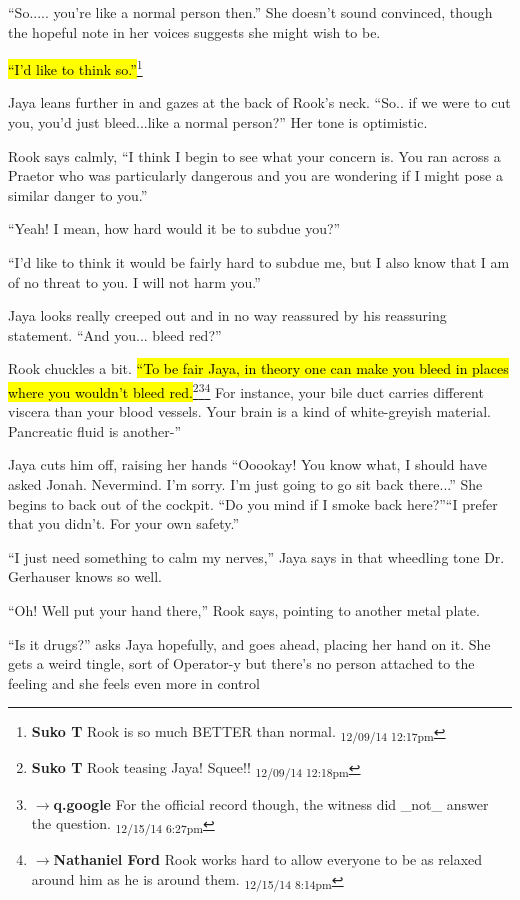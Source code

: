 ``So..... you're like a normal person then.''  She doesn't sound convinced, though the hopeful note in her voices suggests she might wish to be.

\hl{``I'd like to think so.''}\footnote{\textbf{Suko T }Rook is so much BETTER than normal. \textsubscript{12/09/14 12:17pm}}

Jaya leans further in and gazes at the back of Rook's neck.  ``So.. if we were to cut you, you'd just bleed...like a normal person?''  Her tone is optimistic.

Rook says calmly, ``I think I begin to see what your concern is.  You ran across a Praetor who was particularly dangerous and you are wondering if I might pose a similar danger to you.''

``Yeah!  I mean, how hard would it be to subdue you?''

``I'd like to think it would be fairly hard to subdue me, but I also know that I am of no threat to you.  I will not harm you.''

Jaya looks really creeped out and in no way reassured by his reassuring statement.   ``And you... bleed red?''

Rook chuckles a bit. \hl{``To be fair Jaya, in theory one can make you bleed in places where you wouldn't bleed red.}\footnote{\textbf{Suko T }Rook teasing Jaya!  Squee!! \textsubscript{12/09/14 12:18pm}}\footnote{$\rightarrow$\textbf{q.google }For the official record though, the witness did \_not\_ answer the question. \textsubscript{12/15/14 6:27pm}}\footnote{$\rightarrow$\textbf{Nathaniel Ford }Rook works hard to allow everyone to be as relaxed around him as he is around them. \textsubscript{12/15/14 8:14pm}} For instance, your bile duct carries different viscera than your blood vessels.  Your brain is a kind of white-greyish material.  Pancreatic fluid is another-''

Jaya cuts him off, raising her hands  ``Ooookay!  You know what, I should have asked Jonah.  Nevermind.  I'm sorry.  I'm just going to go sit back there...'' She begins to back out of the cockpit. ``Do you mind if I smoke back here?''``I prefer that you didn't.  For your own safety.''

``I just need something to calm my nerves,'' Jaya says in that wheedling tone Dr. Gerhauser knows so well.

``Oh!  Well put your hand there,'' Rook says, pointing to another metal plate.

``Is it drugs?'' asks Jaya hopefully, and goes ahead, placing her hand on it.  She gets a weird tingle, sort of Operator-y but there's no person attached to the feeling and she feels even more in control

